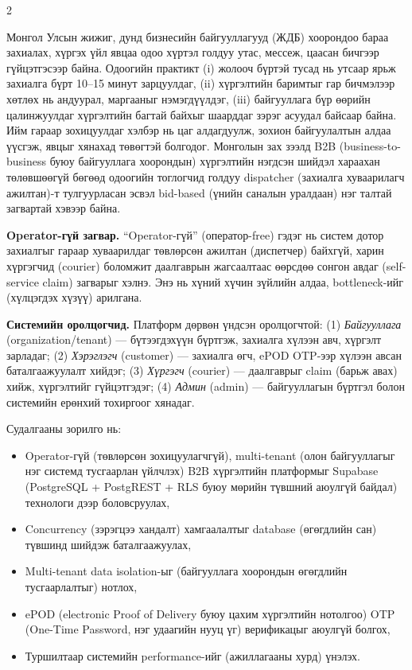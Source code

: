 \vspace{1mm}
\setcounter{table}{0}
\setcounter{figure}{0}
\renewcommand{\thetable}{\arabic{table}}
\renewcommand{\thefigure}{\arabic{figure}}
\setlength{\columnsep}{7mm}
\begin{multicols}{2}
\setlength{\parskip}{5pt}
\sloppy


Монгол Улсын жижиг, дунд бизнесийн байгууллагууд (ЖДБ) хоорондоо бараа захиалах, хүргэх үйл явцаа одоо хүртэл голдуу утас, мессеж, цаасан бичгээр гүйцэтгэсээр байна. Одоогийн практикт (i) жолооч бүртэй тусад нь утсаар ярьж захиалга бүрт 10–15 минут зарцуулдаг, (ii) хүргэлтийн баримтыг гар бичмэлээр хөтлөх нь андуурал, маргааныг нэмэгдүүлдэг, (iii) байгууллага бүр өөрийн цалинжуулдаг хүргэлтийн багтай байхыг шаарддаг зэрэг асуудал байсаар байна. Ийм гараар зохицуулдаг хэлбэр нь цаг алдагдуулж, зохион байгуулалтын алдаа үүсгэж, явцыг хянахад төвөгтэй болгодог. Монголын зах зээлд B2B (business-to-business буюу байгууллага хоорондын) хүргэлтийн нэгдсэн шийдэл хараахан төлөвшөөгүй бөгөөд одоогийн тоглогчид голдуу dispatcher (захиалга хуваарилагч ажилтан)-т тулгуурласан эсвэл bid-based (үнийн саналын уралдаан) нэг талтай загвартай хэвээр байна.

\textbf{Operator-гүй загвар.} ``Operator-гүй'' (оператор-free) гэдэг нь систем дотор захиалгыг гараар хуваарилдаг төвлөрсөн ажилтан (диспетчер) байхгүй, харин хүргэгчид (courier) боломжит даалгаврын жагсаалтаас өөрсдөө сонгон авдаг (self-service claim) загварыг хэлнэ. Энэ нь хүний хүчин зүйлийн алдаа, bottleneck-ийг (хүлцэгдэх хүзүү) арилгана.

\textbf{Системийн оролцогчид.} Платформ дөрвөн үндсэн оролцогчтой: (1) \emph{Байгууллага} (organization/tenant) — бүтээгдэхүүн бүртгэж, захиалга хүлээн авч, хүргэлт зарладаг; (2) \emph{Хэрэглэгч} (customer) — захиалга өгч, ePOD OTP-ээр хүлээн авсан баталгаажуулалт хийдэг; (3) \emph{Хүргэгч} (courier) — даалгаврыг claim (барьж авах) хийж, хүргэлтийг гүйцэтгэдэг; (4) \emph{Админ} (admin) — байгууллагын бүртгэл болон системийн ерөнхий тохиргоог хянадаг.

Судалгааны зорилго нь:
\begin{itemize}
    \item Operator-гүй (төвлөрсөн зохицуулагчгүй), multi-tenant (олон байгууллагыг нэг системд тусгаарлан үйлчлэх) B2B хүргэлтийн платформыг Supabase (PostgreSQL + PostgREST + RLS буюу мөрийн түвшний аюулгүй байдал) технологи дээр боловсруулах,
    \item Concurrency (зэрэгцээ хандалт) хамгаалалтыг database (өгөгдлийн сан) түвшинд шийдэж баталгаажуулах,
    \item Multi-tenant data isolation-ыг (байгууллага хоорондын өгөгдлийн тусгаарлалтыг) нотлох,
    \item ePOD (electronic Proof of Delivery буюу цахим хүргэлтийн нотолгоо) OTP (One-Time Password, нэг удаагийн нууц үг) верификацыг аюулгүй болгох,
    \item Туршилтаар системийн performance-ийг (ажиллагааны хурд) үнэлэх.
\end{itemize}


\end{multicols}
